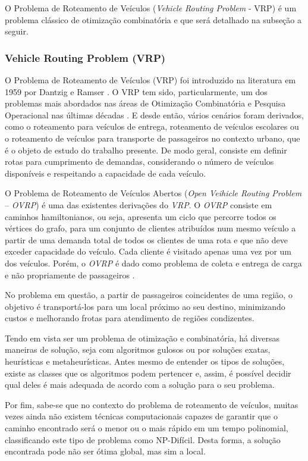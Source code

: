 O Problema de Roteamento de Veículos (\emph{Vehicle Routing Problem} - VRP) é um problema clássico de otimização combinatória e que será detalhado na subseção a seguir.

\subsubsection{Vehicle Routing Problem (VRP)} \label{vrp}

O Problema de Roteamento de Veículos (VRP) foi introduzido na literatura em 1959 por Dantzig e Ramser \cite{toth}. O VRP tem sido, particularmente, um dos problemas mais abordados nas áreas de Otimização Combinatória e Pesquisa Operacional nas últimas décadas \cite{steiner2000problema}. E desde então, vários cenários foram derivados, como o roteamento para veículos de entrega, roteamento de veículos escolares ou o roteamento de veículos para transporte de passageiros no contexto urbano, que é o objeto de estudo do trabalho presente. De modo geral, consiste em definir rotas para cumprimento de demandas, considerando o número de veículos disponíveis e respeitando a capacidade de cada veículo.

O Problema de Roteamento de Veículos Abertos (\emph{Open Veihicle Routing Problem} -- \emph{OVRP}) é uma das existentes derivações do \emph{VRP}. O \emph{OVRP} consiste em caminhos hamiltonianos, ou seja, apresenta um ciclo que percorre todos os vértices do grafo, para um conjunto de clientes atribuídos num mesmo veículo a partir de uma demanda total de todos os clientes de uma rota e que não deve exceder capacidade do veículo. Cada cliente é visitado apenas uma vez por um dos veículos. Porém, o \emph{OVRP} é dado como problema de coleta e entrega de carga e não propriamente de passageiros \cite{BRANDAO2004552}.

No problema em questão, a partir de passageiros coincidentes de uma região, o objetivo é transportá-los para um local próximo ao seu destino, minimizando custos e melhorando frotas para atendimento de regiões condizentes. 

Tendo em vista ser um problema de otimização e combinatória, há diversas maneiras de solução, seja com algoritmos gulosos ou por soluções exatas, heurísticas e metaheurísticas. Antes mesmo de entender os tipos de soluções, existe as classes que os algoritmos podem pertencer e, assim, é possível decidir qual deles é mais adequada de acordo com a solução para o seu problema.

Por fim, sabe-se que no contexto do problema de roteamento de veículos, muitas vezes ainda não existem técnicas computacionais capazes de garantir que o caminho encontrado será o menor ou o mais rápido em um tempo polinomial, classificando este tipo de problema como NP-Difícil. Desta forma, a solução encontrada pode não ser ótima global, mas sim a local.

